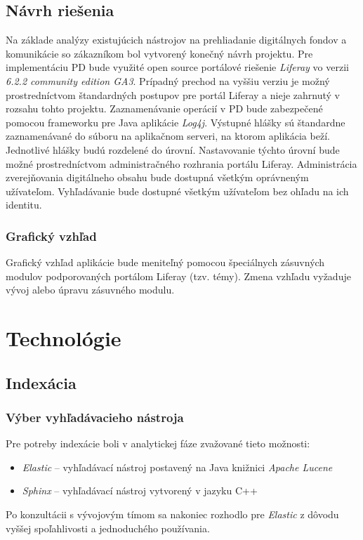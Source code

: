 \documentclass[
  digital, %
  table,   %
  lof,     %
  lot,     %
]{fithesis3}
\begin{document}
\section{Návrh riešenia}
Na základe analýzy existujúcich nástrojov na prehliadanie digitálnych fondov a komunikácie so zákazníkom bol vytvorený konečný návrh projektu. Pre implementáciu PD bude využité open source
portálové riešenie \textit{Liferay} vo verzii \textit{6.2.2 community edition GA3}. Prípadný prechod na vyššiu verziu je možný prostredníctvom štandardných postupov pre portál Liferay a nieje zahrnutý v rozsahu tohto projektu. Zaznamenávanie operácií v PD bude zabezpečené pomocou frameworku pre Java aplikácie \textit{Log4j}. Výstupné hlášky sú štandardne zaznamenávané do súboru na aplikačnom serveri, na ktorom aplikácia beží. Jednotlivé hlášky budú rozdelené do úrovní. Nastavovanie týchto úrovní bude možné prostredníctvom administračného rozhrania portálu Liferay. Administrácia zverejňovania digitálneho obsahu bude dostupná všetkým oprávneným užívateľom. Vyhľadávanie bude dostupné všetkým užívateľom bez ohľadu na ich identitu.

\subsection{Grafický vzhľad}
Grafický vzhľad aplikácie bude meniteľný pomocou špeciálnych zásuvných modulov podporovaných portálom Liferay (tzv. témy). Zmena vzhľadu vyžaduje vývoj alebo úpravu zásuvného modulu.
\chapter{Technológie}
\section{Indexácia}
\subsection{Výber vyhľadávacieho nástroja}
Pre potreby indexácie boli v analytickej fáze zvažované tieto možnosti:
\begin{itemize}
	\item \textit{Elastic} – vyhľadávací nástroj postavený na Java knižnici \textit{Apache Lucene}
	\item \textit{Sphinx} – vyhľadávací nástroj vytvorený v jazyku C++
\end{itemize}
Po konzultácii s vývojovým tímom sa nakoniec rozhodlo pre \textit{Elastic} z dôvodu vyššej spoľahlivosti a jednoduchého používania.
\end{document}
